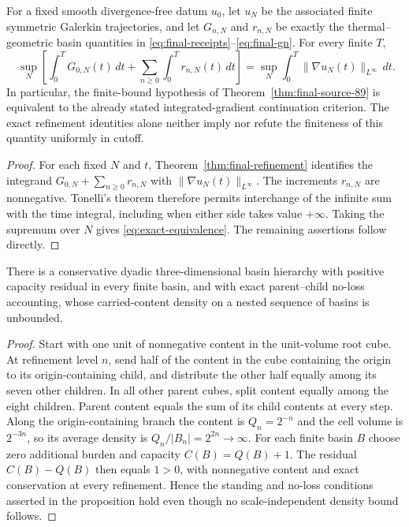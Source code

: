 \begin{theorem}\label{thm:certificate-equivalence}
For a fixed smooth divergence-free datum $u_0$, let $u_N$ be the
associated finite symmetric Galerkin trajectories, and let $G_{n,N}$
and $r_{n,N}$ be exactly the thermal--geometric basin quantities in
\eqref{eq:final-receipts}--\eqref{eq:final-gn}. For every finite $T$,
\begin{equation}\label{eq:exact-equivalence}
\boxed{\quad
\sup_N\left[\int_0^T G_{0,N}(t)\,dt+
 \sum_{n\ge0}\int_0^T r_{n,N}(t)\,dt\right]
 =\sup_N\int_0^T\|\nabla u_N(t)\|_{L^\infty}\,dt.
\quad}
\end{equation}
In particular, the finite-bound hypothesis of Theorem~\ref{thm:final-source-89}
is equivalent to the already stated integrated-gradient continuation criterion.
The exact refinement identities alone neither imply nor refute the finiteness
of this quantity uniformly in cutoff.
\end{theorem}
\begin{proof}
For each fixed $N$ and $t$, Theorem~\ref{thm:final-refinement}
identifies the integrand $G_{0,N}+\sum_{n\ge0}r_{n,N}$ with
$\|\nabla u_N(t)\|_{L^\infty}$. The increments $r_{n,N}$ are
nonnegative. Tonelli's theorem therefore permits interchange of the
infinite sum with the time integral, including when either side takes
value $+\infty$. Taking the supremum over $N$ gives
\eqref{eq:exact-equivalence}. The remaining assertions follow directly.
\end{proof}

\begin{proposition}\label{prop:capacity-countermodel}
There is a conservative dyadic three-dimensional basin hierarchy with
positive capacity residual in every finite basin, and with exact
parent--child no-loss accounting, whose carried-content density on a
nested sequence of basins is unbounded.
\end{proposition}
\begin{proof}
Start with one unit of nonnegative content in the unit-volume root cube.
At refinement level $n$, send half of the content in the cube containing
the origin to its origin-containing child, and distribute the other half
equally among its seven other children. In all other parent cubes,
split content equally among the eight children. Parent content equals
the sum of its child contents at every step. Along the origin-containing
branch the content is $Q_n=2^{-n}$ and the cell volume is $2^{-3n}$,
so its average density is $Q_n/|B_n|=2^{2n}\to\infty$.
For each finite basin $B$ choose zero additional burden and capacity
$C(B)=Q(B)+1$. The residual $C(B)-Q(B)$ then equals $1>0$,
with nonnegative content and exact conservation at every refinement.
Hence the standing and no-loss conditions asserted in the proposition
hold even though no scale-independent density bound follows.
\end{proof}

